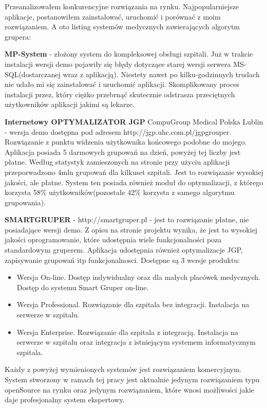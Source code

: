 Przeanalizowałem konkurencyjne rozwiązania na rynku. Najpopularniejsze aplikacje, postanowiłem zainstalować, uruchomić i porównać z moim rozwiązaniem. A oto listing systemów medycznych zawierających algorytm grupera:

\textbf{MP-System} - złożony system do kompleksowej obsługi szpitali. Już w trakcie instalacji wersji demo pojawiły się błędy dotyczące starej wersji serwera MS-SQL(dostarczanej wraz z aplikacją). Niestety nawet po kilku-godzinnych trudach nie udało mi się zainstalować i uruchomić aplikacji. Skomplikowany proces instalacji przez, który ciężko przebrnąć skutecznie odstrasza przeciętnych użytkowników aplikacji jakimi są lekarze.

\textbf{Internetowy OPTYMALIZATOR JGP} CompuGroup Medical Polska Lublin - wersja demo dostępna pod adresem http://jgp.uhc.com.pl/jgpgrouper.
Rozwiązanie z punktu widzenia użytkownika końcowego podobne do mojego. Aplikacja posiada 5 darmowych grupowań na dzień, powyżej tej liczby jest płatne. Według statystyk zamieszonych na stronie przy użyciu aplikacji przeporwadzono 4mln grupowań dla kilkuset szpitali. Jest to rozwiązanie wysokiej jakości, ale płatne.
System ten posiada również moduł do optymalizacji, z którego korzysta 58\% użytkowników(pozostałe 42\% korzysta z samego algorytmu grupowania).

\textbf{SMARTGRUPER} - http://smartgruper.pl - jest to rozwiązanie płatne, nie posiadające wersji demo. Z opisu na stronie projektu wynika, że jest to wysokiej jakości oprogramowanie, które udostępnia wiele funkcjonalności poza standardowym gruperem. Aplikacja udostępnia również optymalizacje JGP, zapisywanie grupowań itp funkcjonalnosci. Dostępne są 3 wersje produktu:
\begin{itemize}
 \item Wersja On-line. Dostęp indywidualny oraz dla małych placówek medycznych. Dostęp do systemu Smart Gruper on-line.
 \item Wersja Professional. Rozwiązanie dla szpitala bez integracji. Instalacja na serwerze w szpitalu.
 \item Wersja Enterprise. Rozwiązanie dla szpitala z integracją. Instalacja na serwerze w szpitalu oraz integracja z istniejącym systemem informatycznym szpitala.
\end{itemize}

Każdy z powyżej wymienionych systemów jest rozwiązaniem komercyjnym. System stworzony w ramach tej pracy jest aktualnie jedynym rozwiązaniem typu openSource na rynku oraz jedynym rozwiązaniem, które wnosi możliwości jakie daje profesjonalny system ekspertowy.

